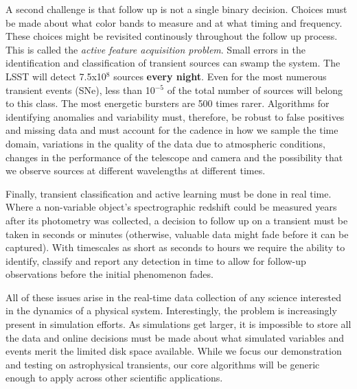 \documentclass[prd,nofootbib,floatfix,11pt,tightenlines,nofootinbib]{revtex4}
\begin{document}
A second challenge is that follow up is not a single binary decision.
Choices must be made about what color bands to measure and at what timing
and frequency.  These choices might be revisited continously throughout the
follow up process.  This is called the {\em active feature acquisition
  problem}. Small errors in the identification and classification of transient
sources can swamp the system.  The LSST will detect 7.5x10$^8$ sources
{\bf every night}.  Even for the most numerous transient events (SNe), less
than 10$^{-5}$ of the total number of sources will belong to this class.
The most energetic bursters are 500 times rarer.  Algorithms for
identifying anomalies and variability must, therefore, be robust to false
positives and missing data and must account for the cadence in how we
sample the time domain, variations in the quality of the data due to
atmospheric conditions, changes in the performance of the telescope and
camera and the possibility that we observe sources at different wavelengths
at different times.

Finally, transient classification and active learning must be done in real
time.  Where a non-variable object's spectrographic redshift could be measured years
after its photometry was collected, a decision to follow up on a transient
must be taken in seconds or minutes (otherwise, valuable data
might fade before it can be captured).  With timescales as short as seconds
to hours we require the ability to identify, classify and report any
detection in time to allow for follow-up observations before the initial
phenomenon fades.

All of these issues arise in the real-time data collection of any science
interested in the dynamics of a physical system.  Interestingly, the
problem is increasingly present in simulation efforts.  As simulations get
larger, it is impossible to store all the data and online decisions must be
made about what simulated variables and events merit the limited disk space
available.  While we focus our demonstration and testing on astrophysical
transients, our core algorithms will be generic enough to apply across
other scientific applications.
\end{document}

